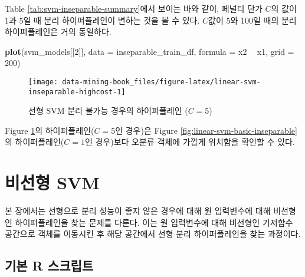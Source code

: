 \documentclass[]{book}
\newenvironment{Shaded}{\begin{snugshade}}{\end{snugshade}}
\newcommand{\DataTypeTok}[1]{\textcolor[rgb]{0.13,0.29,0.53}{#1}}
\newcommand{\DecValTok}[1]{\textcolor[rgb]{0.00,0.00,0.81}{#1}}
\newcommand{\KeywordTok}[1]{\textcolor[rgb]{0.13,0.29,0.53}{\textbf{#1}}}
\newcommand{\NormalTok}[1]{#1}
\newcommand{\OperatorTok}[1]{\textcolor[rgb]{0.81,0.36,0.00}{\textbf{#1}}}
\newcommand{\StringTok}[1]{\textcolor[rgb]{0.31,0.60,0.02}{#1}}
\begin{document}
Table \ref{tab:svm-inseparable-summary}에서 보이는 바와 같이, 페널티 단가 \(C\)의 값이 1과 5일 때 분리 하이퍼플레인이 변하는 것을 볼 수 있다. \(C\)값이 5와 100일 때의 분리 하이퍼플레인은 거의 동일하다.

\begin{Shaded}
\begin{Highlighting}[]
\KeywordTok{plot}\NormalTok{(svm_models[[}\DecValTok{2}\NormalTok{]], }\DataTypeTok{data =}\NormalTok{ inseparable_train_df, }\DataTypeTok{formula =}\NormalTok{ x2 }\OperatorTok{~}\StringTok{ }\NormalTok{x1, }\DataTypeTok{grid =} \DecValTok{200}\NormalTok{)}
\end{Highlighting}
\end{Shaded}

\begin{figure}

{\centering \texttt{[image: data-mining-book\_files/figure-latex/linear-svm-inseparable-highcost-1]} 

}

\caption{선형 SVM 분리 불가능 경우의 하이퍼플레인 ($C = 5$)}\label{fig:linear-svm-inseparable-highcost}
\end{figure}

Figure \ref{fig:linear-svm-inseparable-highcost}의 하이퍼플레인(\(C = 5\)인 경우)은 Figure \ref{fig:linear-svm-basic-inseparable}의 하이퍼플레인(\(C = 1\)인 경우)보다 오분류 객체에 가깝게 위치함을 확인할 수 있다.

\hypertarget{nonlinear-svm}{%
\section{비선형 SVM}\label{nonlinear-svm}}

본 장에서는 선형으로 분리 성능이 좋지 않은 경우에 대해 원 입력변수에 대해 비선형인 하이퍼플레인을 찾는 문제를 다룬다. 이는 원 입력변수에 대해 비선형인 기저함수 공간으로 객체를 이동시킨 후 해당 공간에서 선형 분리 하이퍼플레인을 찾는 과정이다.

\hypertarget{nonlinear-svm-basic-script}{%
\subsection{기본 R 스크립트}\label{nonlinear-svm-basic-script}}
\end{document}

